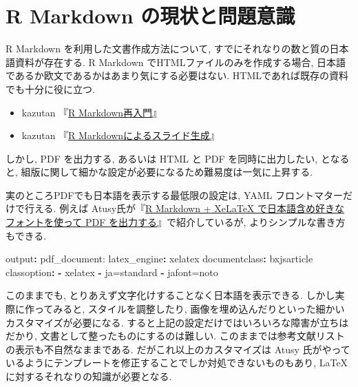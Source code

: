 \documentclass[
  xelatex,ja=standard,jafont=noto]{bxjsbook}
\newenvironment{Shaded}{\begin{snugshade}}{\end{snugshade}}
\newcommand{\AttributeTok}[1]{\textcolor[rgb]{0.77,0.63,0.00}{#1}}
\newcommand{\FunctionTok}[1]{\textcolor[rgb]{0.00,0.00,0.00}{#1}}
\newcommand{\KeywordTok}[1]{\textcolor[rgb]{0.13,0.29,0.53}{\textbf{#1}}}
\providecommand{\tightlist}{%
  \setlength{\itemsep}{0pt}\setlength{\parskip}{0pt}}
\theoremstyle{definition}
\theoremstyle{definition}
\theoremstyle{definition}
\theoremstyle{definition}
\theoremstyle{remark}
\begin{document}
\hypertarget{r-markdown-ux306eux73feux72b6ux3068ux554fux984cux610fux8b58}{%
\section*{R Markdown
の現状と問題意識}\label{r-markdown-ux306eux73feux72b6ux3068ux554fux984cux610fux8b58}}

R Markdown を利用した文書作成方法について,
すでにそれなりの数と質の日本語資料が存在する. R Markdown
でHTMLファイルのみを作成する場合,
日本語であるか欧文であるかはあまり気にする必要はない.
HTMLであれば既存の資料でも十分に役に立つ.

\begin{itemize}
\tightlist
\item
  kazutan
  『\href{https://kazutan.github.io/fukuokaR11/intro_rmarkdown_d.html}{R
  Markdown再入門}』
\item
  kazutan
  『\href{https://kazutan.github.io/SappoRoR6/rmd_slide.html\#/}{R
  Markdownによるスライド生成}』
\end{itemize}

しかし, PDF を出力する, あるいは HTML と PDF を同時に出力したい,
となると, 組版に関して細かな設定が必要になるため難易度は一気に上昇する.

実のところPDFでも日本語を表示する最低限の設定は, YAML
フロントマターだけで行える. 例えば
Atusy氏が『\href{https://blog.atusy.net/2019/05/14/rmd2pdf-any-font/}{R
Markdown + XeLaTeX で日本語含め好きなフォントを使って PDF
を出力する}』で紹介しているが, よりシンプルな書き方もできる.

\begin{Shaded}
\begin{Highlighting}[]
\FunctionTok{output}\KeywordTok{:}\AttributeTok{ pdf\_document:}
\AttributeTok{    }\FunctionTok{latex\_engine}\KeywordTok{:}\AttributeTok{ xelatex}
\FunctionTok{documentclass}\KeywordTok{:}\AttributeTok{ bxjsarticle}
\FunctionTok{classoption}\KeywordTok{:}
\AttributeTok{  }\KeywordTok{{-}}\AttributeTok{ xelatex}
\AttributeTok{  }\KeywordTok{{-}}\AttributeTok{ ja=standard}
\AttributeTok{  }\KeywordTok{{-}}\AttributeTok{ jafont=noto}
\end{Highlighting}
\end{Shaded}

このままでも, とりあえず文字化けすることなく日本語を表示できる.
しかし実際に作ってみると, スタイルを調整したり,
画像を埋め込んだりといった細かいカスタマイズが必要になる.
すると上記の設定だけではいろいろな障害が立ちはだかり,
文書として整ったものにするのは難しい.
このままでは参考文献リストの表示も不自然なままである.
だがこれ以上のカスタマイズは Atusy
氏がやっているようにテンプレートを修正することでしか対処できないものもあり,
\LaTeX に対するそれなりの知識が必要となる.
\end{document}
